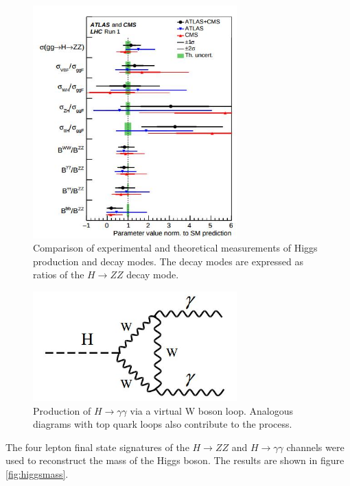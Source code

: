 \documentclass[oneside, letterpaper, oldfontcommands]{memoir}
\begin{document}
\begin{figure}[here]
\includegraphics[width=0.7\textwidth]{higgscouplings.jpg}
\caption{Comparison of experimental and theoretical measurements of Higgs production and decay modes. The decay modes are expressed as ratios of the $H \rightarrow ZZ$ decay mode. \cite{Khachatryan:2016vau}}
\label{fig:higgsSMBR}
\end{figure}

\begin{figure}[here]
\includegraphics[width=0.7\textwidth]{higgswwgammagamma.jpg}
\caption{Production of $H \rightarrow \gamma \gamma$ via a virtual W boson loop. Analogous diagrams with top quark loops also contribute to the process.}
\label{fig:higgsgg}
\end{figure}

\qquad The four lepton final state signatures of the $H \rightarrow ZZ$ and $H \rightarrow \gamma\gamma$ channels were used to reconstruct the mass of the Higgs boson. The results are shown in figure \ref{fig:higgsmass}. 
\end{document}
